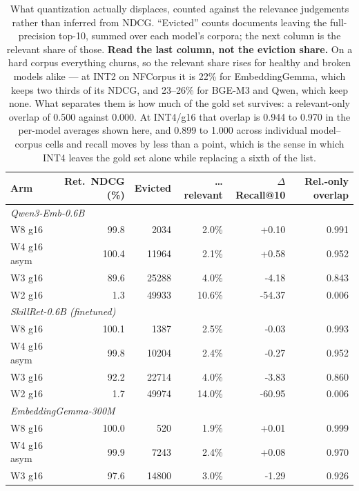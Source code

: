 \begin{table}[t]\centering\small
\setlength{\tabcolsep}{4pt}
\caption{What quantization actually displaces, counted against the relevance judgements
rather than inferred from NDCG. ``Evicted'' counts documents leaving the full-precision
top-10, summed over each model's corpora; the next column is the relevant share of those.
\textbf{Read the last column, not the eviction share.} On a hard corpus everything churns,
so the relevant share rises for healthy and broken models alike --- at INT2 on NFCorpus it is
22\% for EmbeddingGemma, which keeps two thirds of its NDCG, and 23--26\% for BGE-M3 and
Qwen, which keep none. What separates them is how much of the gold set survives: a
relevant-only overlap of 0.500 against 0.000. At INT4/g16 that overlap is 0.944 to 0.970 in the per-model averages shown here, and 0.899
to 1.000 across individual model--corpus cells
and recall moves by less than a point, which is the sense in which INT4 leaves the gold set
alone while replacing a sixth of the list.}
\label{tab:turnover}
\begin{tabular}{lrrrrr}
\toprule
Arm & Ret.\ NDCG (\%) & Evicted & \ldots relevant & $\Delta$Recall@10 & Rel.-only overlap \\
\midrule
\multicolumn{5}{l}{\emph{Qwen3-Emb-0.6B}} \\
\quad W8 g16 & 99.8 & 2034 & 2.0\% & +0.10 & 0.991 \\
\quad W4 g16 asym & 100.4 & 11964 & 2.1\% & +0.58 & 0.952 \\
\quad W3 g16 & 89.6 & 25288 & 4.0\% & -4.18 & 0.843 \\
\quad W2 g16 & 1.3 & 49933 & 10.6\% & -54.37 & 0.006 \\
\multicolumn{5}{l}{\emph{SkillRet-0.6B (finetuned)}} \\
\quad W8 g16 & 100.1 & 1387 & 2.5\% & -0.03 & 0.993 \\
\quad W4 g16 asym & 99.8 & 10204 & 2.4\% & -0.27 & 0.952 \\
\quad W3 g16 & 92.2 & 22714 & 4.0\% & -3.83 & 0.860 \\
\quad W2 g16 & 1.7 & 49974 & 14.0\% & -60.95 & 0.006 \\
\multicolumn{5}{l}{\emph{EmbeddingGemma-300M}} \\
\quad W8 g16 & 100.0 & 520 & 1.9\% & +0.01 & 0.999 \\
\quad W4 g16 asym & 99.9 & 7243 & 2.4\% & +0.08 & 0.970 \\
\quad W3 g16 & 97.6 & 14800 & 3.0\% & -1.29 & 0.926 \\

\end{tabular}
\end{table}

